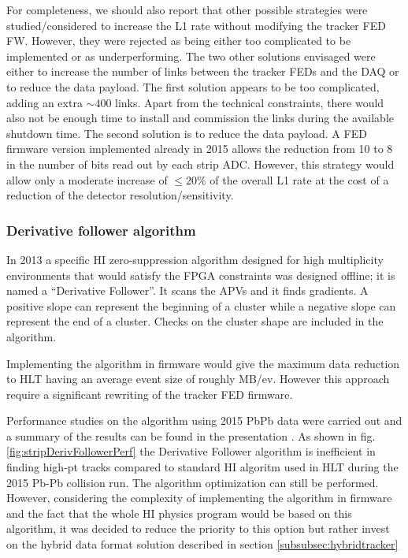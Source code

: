 For completeness, we should also report that other possible strategies were studied/considered to increase the L1 rate
without modifying the tracker FED FW. However, they were rejected as being either too complicated to be implemented or
as underperforming. The two other solutions envisaged were either to increase the number of links between the tracker
FEDs and the DAQ or to reduce the data payload. The first solution appears to be too complicated, adding an extra $\sim
400$ links. Apart from the technical constraints, there would also not be enough time to install and commission the
links during the available shutdown time. The second solution is to reduce the data payload. A FED firmware version
implemented already in 2015 allows the reduction from 10 to 8 in the number of bits read out by each strip ADC. However,
this strategy would allow only a moderate increase of $\le 20 \%$ of the overall L1 rate at the cost of a reduction of
the detector resolution/sensitivity. 

\subsubsection{Derivative follower algorithm \label{subsubsec:DerFollower}}
In 2013 a specific HI zero-suppression algorithm designed for high multiplicity environments that would satisfy the FPGA
constraints was designed offline; it is named a ``Derivative Follower''. It scans the APVs and it finds gradients. A positive slope can represent the beginning of a cluster while a negative slope can represent the end of a cluster. Checks on the cluster shape are included in the algorithm. 

Implementing the algorithm in firmware would give the maximum data reduction to HLT having an average event size of roughly MB/ev. However this approach require a significant rewriting of the tracker FED firmware. 


Performance studies on the algorithm using 2015 PbPb data were carried out and a summary of the results can be found in the presentation \cite{stripDerFollPerf}. As shown in fig. \ref{fig:stripDerivFollowerPerf}
the Derivative Follower algorithm is inefficient in finding high-pt tracks compared to standard HI algoritm used in HLT during the 2015 Pb-Pb collision run. The algorithm optimization can still be performed. However, considering the complexity of implementing the algorithm in firmware and the fact that the whole HI physics program would be based on this algorithm, it was decided to reduce the priority to this option but rather invest on the hybrid data format solution described in section \ref{subsubsec:hybridtracker}

